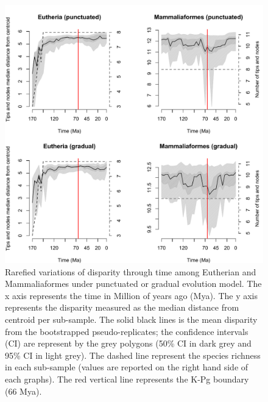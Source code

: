 \documentclass[12pt,letterpaper]{article}
\begin{document}
\begin{figure}[!htbp]
\centering
    \includegraphics[keepaspectratio=true]{Figures/Main_results_rarefied.pdf}
\caption{Rarefied variations of disparity through time among Eutherian and Mammaliaformes under punctuated or gradual evolution model. The x axis represents the time in Million of years ago (Mya). The y axis represents the disparity measured as the median distance from centroid per sub-sample. The solid black lines is the mean disparity from the bootstrapped pseudo-replicates; the confidence intervals (CI) are represent by the grey polygons (50\% CI in dark grey and 95\% CI in light grey). The dashed line represent the species richness in each sub-sample (values are reported on the right hand side of each graphs). The red vertical line represents the K-Pg boundary (66 Mya).}
\label{fig:Fig_Rar_results}
\end{figure}
\end{document}
